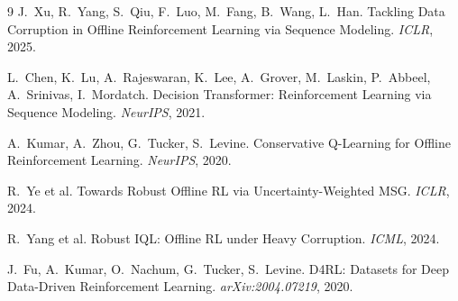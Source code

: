\documentclass[10pt,twocolumn,letterpaper]{article}
\begin{document}
\small
\begin{thebibliography}{9}
J.~Xu, R.~Yang, S.~Qiu, F.~Luo, M.~Fang, B.~Wang, L.~Han.
\newblock Tackling Data Corruption in Offline Reinforcement Learning via Sequence Modeling.
\newblock \emph{ICLR}, 2025.

L.~Chen, K.~Lu, A.~Rajeswaran, K.~Lee, A.~Grover, M.~Laskin, P.~Abbeel, A.~Srinivas, I.~Mordatch.
\newblock Decision Transformer: Reinforcement Learning via Sequence Modeling.
\newblock \emph{NeurIPS}, 2021.

A.~Kumar, A.~Zhou, G.~Tucker, S.~Levine.
\newblock Conservative Q-Learning for Offline Reinforcement Learning.
\newblock \emph{NeurIPS}, 2020.

R.~Ye et al.
\newblock Towards Robust Offline RL via Uncertainty-Weighted MSG.
\newblock \emph{ICLR}, 2024.

R.~Yang et al.
\newblock Robust IQL: Offline RL under Heavy Corruption.
\newblock \emph{ICML}, 2024.

J.~Fu, A.~Kumar, O.~Nachum, G.~Tucker, S.~Levine.
\newblock D4RL: Datasets for Deep Data-Driven Reinforcement Learning.
\newblock \emph{arXiv:2004.07219}, 2020.
\end{thebibliography}
\end{document}
